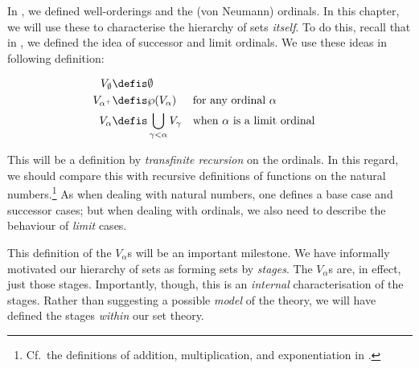 \documentclass[../../../include/open-logic-section]{subfiles}
\begin{document}


In , we defined well-orderings and the
(von Neumann) ordinals. In this chapter, we will use these to
characterise the hierarchy of sets \emph{itself}. To do this, recall
that in , we defined the idea of
successor and limit ordinals. We use these ideas in following
definition:

\begin{defn}
	\begin{align*}
	V_\emptyset &\defis \emptyset\\
	V_{\ordsucc{\alpha}} &\defis \Pow{V_\alpha} & & 
	\text{for any ordinal }\alpha\\
	V_{\alpha} &\defis \bigcup_{\gamma < \alpha} V_\gamma & & 
	\text{when }\alpha\text{ is a limit ordinal}
\end{align*}
\end{defn}
\noindent
This will be a definition by \emph{transfinite recursion} on the
ordinals. In this regard, we should compare this with recursive
definitions of functions on the natural numbers.\footnote{Cf.\ the
definitions of addition, multiplication, and exponentiation in
.} As when dealing with natural
numbers, one defines a base case and successor cases; but when dealing
with ordinals, we also need to describe the behaviour of \emph{limit}
cases. 

This definition of the $V_\alpha$s will be an important milestone. We
have informally motivated our hierarchy of sets as forming sets by
\emph{stages}. The $V_\alpha$s are, in effect, just those stages.
Importantly, though, this is an \emph{internal} characterisation of
the stages. Rather than suggesting a possible \emph{model} of the
theory, we will have defined the stages \emph{within} our set theory.
\end{document}
